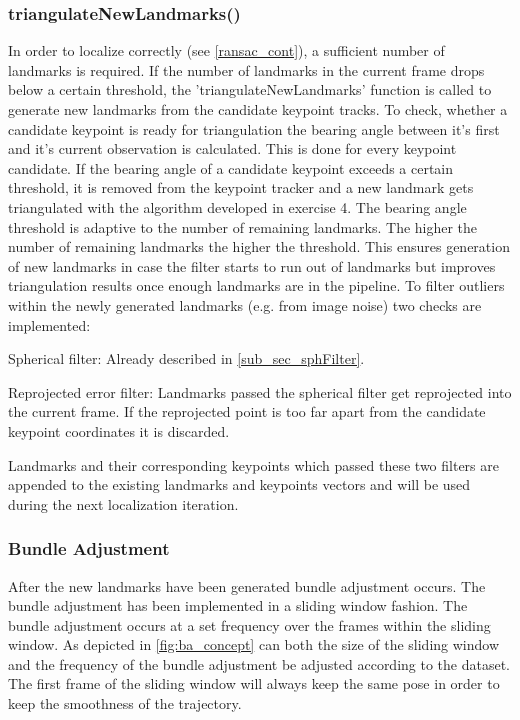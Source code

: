 \subsubsection{triangulateNewLandmarks()} \label{triang_cont}
In order to localize correctly (see \cref{ransac_cont}), a sufficient number of landmarks is required. If the number of landmarks in the current frame drops below a certain threshold, the 'triangulateNewLandmarks' function is called to generate new landmarks from the candidate keypoint tracks. To check, whether a candidate keypoint is ready for triangulation the bearing angle between it's first and it's current observation is calculated. This is done for every keypoint candidate. If the bearing angle of a candidate keypoint exceeds a certain threshold, it is removed from the keypoint tracker and a new landmark gets triangulated with the algorithm developed in exercise 4. The bearing angle threshold is adaptive to the number of remaining landmarks. The higher the number of remaining landmarks the higher the threshold. This ensures generation of new landmarks in case the filter starts to run out of landmarks but improves triangulation results once enough landmarks are in the pipeline.
To filter outliers within the newly generated landmarks (e.g. from image noise) two checks are implemented:
\begin{compactenum}
	\item Spherical filter: Already described in \cref{sub_sec_sphFilter}.
	\item Reprojected error filter: Landmarks passed the spherical filter get reprojected into the current frame. If the reprojected point is too far apart from the candidate keypoint coordinates it is discarded.
\end{compactenum}
Landmarks and their corresponding keypoints which passed these two filters are appended to the existing landmarks and keypoints vectors and will be used during the next localization iteration.

\subsubsection{Bundle Adjustment}
After the new landmarks have been generated bundle adjustment occurs. The bundle adjustment has been implemented in a sliding window fashion. The bundle adjustment occurs at a set frequency over the frames within the sliding window. As depicted in \cref{fig:ba_concept} can both the size of the sliding window and the frequency of the bundle adjustment be adjusted according to the dataset. The first frame of the sliding window will always keep the same pose in order to keep the smoothness of the trajectory.

